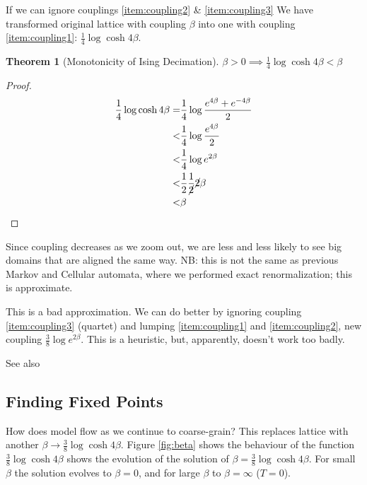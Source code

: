 \documentclass[]{article}
\newtheorem{thm}{Theorem}
\begin{document}
If we can ignore couplings \ref{item:coupling2} \& \ref{item:coupling3} We have transformed original lattice with coupling $\beta$ into one with coupling \ref{item:coupling1}: $\frac{1}{4} \log{\cosh{4\beta}}$.

\begin{thm}[Monotonicity of Ising Decimation]
	$\beta > 0 \implies \frac{1}{4} \log{\cosh{4\beta}} < \beta$
\end{thm}

\begin{proof}
	\begin{align*}
	\frac{1}{4} \log{\cosh{4\beta}} =& \frac{1}{4} \log{\frac{e^{4\beta} + e^{- 4 \beta}}{2}}\\
	<&  \frac{1}{4} \log{\frac{e^{4\beta} }{2}}\\
	<& \frac{1}{4} \log{e^{2\beta} } \\
	<& \frac{1}{2} \frac{1}{\cancel{2}} \cancel{2} \beta\\
	<& \beta
	\end{align*}
\end{proof}

Since coupling decreases as we zoom out, we are less and less likely to see big domains that are aligned the same way. NB: this is not the same as previous Markov and Cellular automata, where we performed exact renormalization; this is approximate.

This is a bad approximation. We can do better by ignoring coupling \ref{item:coupling3} (quartet) and lumping \ref{item:coupling1} and \ref{item:coupling2}, new coupling $\frac{3}{8} \log{e^{2\beta} }$. This is a heuristic, but, apparently, doesn't work too badly.


See also \cite[Chapter 14]{kadanoff2000statistical}


\subsection{Finding Fixed Points}

How does model flow as we continue to coarse-grain? This replaces lattice with another  $\beta\rightarrow\frac{3}{8} \log{\cosh{4\beta} }$. Figure \ref{fig:beta} shows the behaviour of the function $\frac{3}{8} \log{\cosh{4\beta} }$ shows the evolution of the solution of  $\beta=\frac{3}{8} \log{\cosh{4\beta} }$. For small $\beta$ the solution evolves to $\beta=0$, and for large $\beta$ to $\beta=\infty$ ($T=0$).
\end{document}
